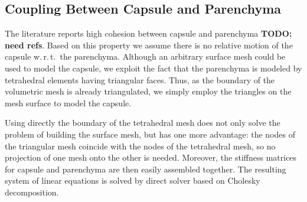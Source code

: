 \documentclass[final,3p,times,twocolumn]{elsarticle}
\def\wrt{w.\,r.\,t.\ }
\newcommand{\CD}[1]{{\color{green}\textbf{CD: #1}}}
\newcommand{\TODO}[1]{{\color{red}\textbf{TODO: #1}}}
\newcommand{\Mat}[1]{\boldsymbol{#1}}
\begin{document}

\subsection{Coupling Between Capsule and Parenchyma} %
The literature reports high cohesion between capsule and parenchyma
\TODO{need refs}.
Based on this property we assume there is no relative motion of the capsule \wrt the parenchyma.
Although an arbitrary surface mesh could be used to model the capsule, we exploit 
the fact that the parenchyma is modeled by tetrahedral elements having
triangular faces. Thus, as the boundary of the volumetric mesh is already
triangulated, we simply employ the triangles on the mesh surface to model the capsule.

Using directly the boundary of the tetrahedral mesh does not only solve the
problem of building the surface mesh, but has one more advantage: the nodes
of the triangular mesh coincide with the nodes of the tetrahedral mesh, so no projection of one mesh onto the other is needed.
Moreover, the stiffness matrices for capsule and parenchyma are then easily assembled
together.
%
The resulting system of linear equations is solved by direct solver based on Cholesky decomposition.
\end{document}
